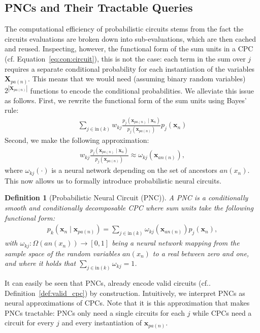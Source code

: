 \documentclass[letterpaper]{article} %
\newcommand{\cf}{cf.\xspace}
\newtheorem{definition}[theorem]{Definition}
\newcommand{\circuit}{\ensuremath{p}}
\newcommand{\inputs}{\ensuremath{\text{in}}}
\newcommand{\Xvars}{\ensuremath{\mathbf{X}}}
\newcommand{\xvars}{\ensuremath{\mathbf{x}}}
\newcommand{\xvar}{\ensuremath{x}}
\newcommand{\weight}{\ensuremath{w}}
\newcommand{\nweight}{\ensuremath{\omega}}
\newcommand{\parents}{\ensuremath{{pa}}}
\newcommand{\ancestors}{\ensuremath{{an}}}
\begin{document}
\subsection{PNCs and Their Tractable Queries}
\label{sec:pnc}

The computational efficiency of probabilistic circuits stems from the fact the circuits evaluations are broken down into sub-evaluations, which are then cached and reused.
Inspecting, however, the functional form of the sum units in a CPC (\cf Equation~\ref{eq:con:circuit}), this is not the case:
each term in the sum over $j$ requires a separate conditional probability for each instantiation of the variables $\Xvars_{\parents(n)}$.
This means that we would need (assuming binary random variables) $2^{|\Xvars_{\parents(n)}|}$ functions to encode the conditional probabilities.
We alleviate this issue as follows. First, we rewrite the functional form of the sum units using Bayes' rule:
\begin{align}
	\sum_{j\in\inputs(k)}
	\weight_{kj}
	\frac{
		\circuit_j(  \xvars_{\parents(n)} \mid \xvars_n  )
	}{
		\circuit_j(  \xvars_{\parents(n)  })
	}
	\circuit_j(  \xvars_n)
\end{align}
Second, we make the following approximation:
\begin{align}
	\weight_{kj}
	\frac{
		\circuit_j(  \xvars_{\parents(n)} \mid \xvars_n  )
	}{
		\circuit_j(  \xvars_{\parents(n)  })
	}
	\approx
	\nweight_{kj}(\xvars_{\ancestors(n)}),
\end{align}
where $\nweight_{kj}(\cdot)$ is a neural network depending on the set of ancestors $\ancestors(\xvar_n)$. This now allows us to formally introduce probabilistic neural circuits.
\begin{definition}[Probabilistic Neural Circuit (PNC)]
	\label{def:pnc}
	A PNC is a conditionally smooth and conditionally decomposable  CPC where sum units take the following functional form:
	\begin{align}
		{\circuit}_k(\xvars_n \mid  \xvars_{\parents(n)})
		=
		\sum_{j\in\inputs(k)} \nweight_{kj} ( \xvars_{\ancestors(n)}) \circuit_j(\xvars_n),
		\label{eq:pnc}
	\end{align}
	with $\nweight_{kj}: \Omega( \ancestors(\xvar_n)) \rightarrow [0,1 ]$ being a neural network mapping from the sample space of the random variables $\ancestors(\xvar_n)$ to a real  between zero and one, and where it holds that $\sum_{j\in\inputs(k)} \nweight_{kj} = 1$.
\end{definition}
It can easily be seen that PNCs, already encode valid circuits (\cf. Definition~\ref{def:valid_cpc}) by construction.
Intuitively, we interpret PNCs as neural approximations of CPCs.
Note that it is this approximation that makes PNCs tractable: PNCs only need a single circuits for each $j$ while CPCs need a circuit for every $j$ and every instantiation of $\xvars_{\parents(n)}$.
\end{document}
